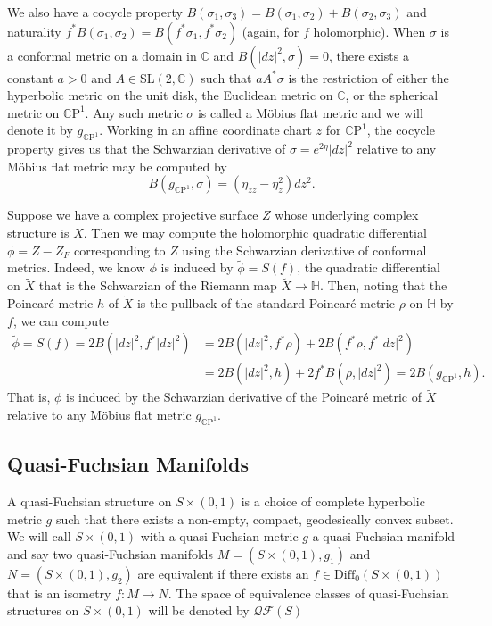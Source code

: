 \documentclass{amsart}
\newcommand{\C}{\mathbb{C}}
\newcommand{\CP}{\mathbb{C}\mathrm{P}}
\renewcommand{\H}{\mathbb{H}}
\begin{document}
 
We also have a cocycle property $B(\sigma_1,\sigma_3) = B(\sigma_1,\sigma_2) + B(\sigma_2,\sigma_3)$ and naturality $f^*B(\sigma_1,\sigma_2) = B(f^*\sigma_1,f^*\sigma_2)$ (again, for $f$ holomorphic). 
When $\sigma$ is a conformal metric on a domain in $\C$ and $B(|dz|^2,\sigma) = 0$, there exists a constant $a > 0$ and $A \in \text{SL}(2,\C)$ such that $aA^*\sigma$ is the restriction of either the hyperbolic metric on the unit disk, the Euclidean metric on $\C$, or the spherical metric on $\CP^1$. 
Any such metric $\sigma$ is called a M\"obius flat metric and we will denote it by $g_{\CP^1}$. 
Working in an affine coordinate chart $z$ for $\CP^1$, the cocycle property gives us that the Schwarzian derivative of $\sigma = e^{2\eta}|dz|^2$ relative to any M\"obius flat metric may be computed by
 \[
 B(g_{\CP^1},\sigma) = (\eta_{zz} - \eta_{z}^2 )dz^2.
 \]


Suppose we have a complex projective surface $Z$ whose underlying complex structure is $X$. 
Then we may compute the holomorphic quadratic differential $\phi = Z - Z_F$ corresponding to $Z$ using the Schwarzian derivative of conformal metrics. 
Indeed, we know $\phi$ is induced by $\tilde{\phi} = S(f)$, the quadratic differential on $\tilde{X}$ that is the Schwarzian of the Riemann map $\tilde{X} \to \H$. 
Then, noting that the Poincar\'e metric $h$ of $\tilde{X}$ is the pullback of the standard Poincar\'e metric $\rho$ on $\H$ by $f$, we can compute
\begin{align*}
\tilde{\phi}
= S(f)
= 2B(|dz|^2,f^*|dz|^2)
&= 2B(|dz|^2,f^*\rho) + 2B(f^*\rho,f^*|dz|^2) \\
&= 2B(|dz|^2,h) + 2f^*B(\rho,|dz|^2)
= 2B(g_{\CP^1},h).
\end{align*}
That is, $\phi$ is induced by the Schwarzian derivative of the Poincar\'e metric of $\tilde{X}$ relative to any M\"obius flat metric $g_{\CP^1}$.



\subsection{Quasi-Fuchsian Manifolds}



A quasi-Fuchsian structure on $S \times (0,1)$ is a choice of complete hyperbolic metric $g$ such that there exists a non-empty, compact, geodesically convex subset. 
We will call $S \times (0,1)$ with a quasi-Fuchsian metric $g$ a quasi-Fuchsian manifold and say two quasi-Fuchsian manifolds $M = (S \times (0,1), g_1)$ and $N = (S \times (0,1), g_2)$ are equivalent if there exists an $f \in \mathrm{Diff}_0(S \times(0,1))$ that is an isometry $f: M \to N$.
The space of equivalence classes of quasi-Fuchsian structures on $S \times (0,1)$ will be denoted by $\mathcal{QF}(S)$
\end{document}
